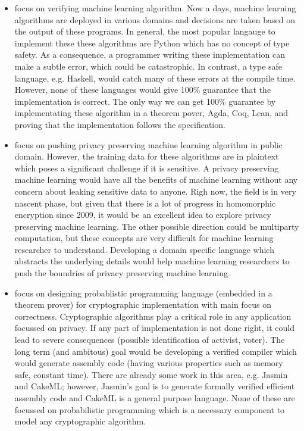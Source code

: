 \documentclass{article}
\begin{document}
\begin{itemize}

\item focus on verifying machine learning algorithm. Now a days, machine learning algorithms are deployed 	
in various domains and decisions are taken based on the output of these programs. In general, 
the most popular langauge to implement these these algorithms are Python which has 
no concept of type safety. As a consequence, a programmer writing these implementation can make 
a subtle error, which could be catastrophic.  In contrast, a type safe language, e.g. Haskell, 
would catch many of these errors at the compile time. However, none of these languages would 
give 100\% guarantee that the implementation is correct. The only way we can get 100\% guarantee  
by implementating these algorithm in a theorem pover, Agda, Coq, Lean,  and proving that 
the implementation follows the specification.  

\item focus on pushing privacy preserving machine learning algorithm in public domain. However,  
the training data for these algorithms are in plaintext which poses a significant challenge if it is sensitive.
A privacy preserving machine learning would have all the benefits of machine learning without 
any concern about leaking sensitive data to anyone. Righ now, the field is in very nascent phase, 
but given that there is a lot of progress in homomorphic encryption since 2009, it would be 
an excellent idea to explore privacy preserving machine learning. The other possible direction could be
multiparty computation, but these concepts are very 
difficult for machine learning researcher to understand.  Developing a domain specific language which 
abstracts the underlying details would help machine learning researchers to push the boundries of 
privacy preserving machine learning. 

\item focus on designing probablistic programming language (embedded in a theorem prover) for 
	cryptographic implementation with main focus on correctness. Cryptographic algorithms 
	play a critical role in any application focussed on privacy. 
	If any part of implementation is not done right, it could lead to severe consequences 
	(possible identification of activist, voter). The long term (and ambitous) goal would be
	developing a verified compiler which would generate assembly code (having various properties such as 
	memory safe, constant time). There are already some 
	work in this area, e.g. Jasmin and CakeML; however,  Jasmin's goal is 
	to generate formally verified efficient assembly code and CakeML is a general purpose 
	language. None of these are focussed on probabilistic programming which is a 
	necessary component to model any cryptographic algorithm.




\end{itemize}
\end{document}
